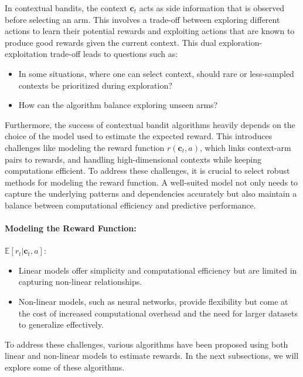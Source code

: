 In contextual bandits, the context $\mathbf{c}_t$ acts as side information that is observed before selecting an arm. This involves a trade-off between exploring different actions to learn their potential rewards and exploiting actions that are known to produce good rewards given the current context. This dual exploration-exploitation trade-off leads to questions such as:
\begin{itemize}
    \item In some situations, where one can select context, should rare or less-sampled contexts be prioritized during exploration?
    \item How can the algorithm balance exploring unseen arms?
\end{itemize}
Furthermore, the success of contextual bandit algorithms heavily depends on the choice of the model used to estimate the expected reward. This introduces challenges like modeling the reward function $r(\mathbf{c}_t, a)$, which links context-arm pairs to rewards, and handling high-dimensional contexts while keeping computations efficient. To address these challenges, it is crucial to select robust methods for modeling the reward function. A well-suited model not only needs to capture the underlying patterns and dependencies accurately but also maintain a balance between computational efficiency and predictive performance.

\paragraph{Modeling the Reward Function:} 
$\mathbb{E}[r_t \vert \mathbf{c}_t, a]$:
\begin{itemize}
    \item Linear models offer simplicity and computational efficiency but are limited in capturing non-linear relationships.
    \item Non-linear models, such as neural networks, provide flexibility but come at the cost of increased computational overhead and the need for larger datasets to generalize effectively.
\end{itemize}


To address these challenges, various algorithms have been proposed using both linear and non-linear models to estimate rewards. In the next subsections, we will explore some of these algorithms.

